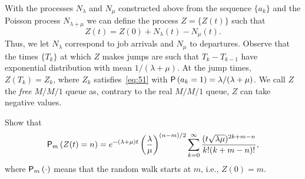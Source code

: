 With the processes $N_\lambda$ and $N_\mu$ constructed above from the sequence $\{a_k\}$ and the Poisson process $N_{\lambda+\mu}$ we can define the process $Z=\{Z(t)\}$ such that
\begin{equation*}
  Z(t) = Z(0)+N_\lambda(t) - N_\mu(t).
\end{equation*}
Thus, we let $N_\lambda$ correspond to job  arrivals and $N_\mu$ to departures. Observe that the times $\{T_k\}$ at which $Z$ makes jumps are such that $T_k-T_{k-1}$ have exponential distribution with mean $1/(\lambda+\mu)$. At the jump times, $Z(T_k) = Z_k$, where $Z_k$ satisfies~\eqref{eq:51} with $\P{a_k = 1} = \lambda/(\lambda+\mu)$.  We call $Z$ the \emph{free} $M/M/1$ queue as, contrary to the real $M/M/1$ queue, $Z$ can take negative values. 

\begin{exercise}  
Show that
\begin{equation*}
    \P{Z(t)=n}_m 
= e^{-(\lambda+\mu)t} \left(\frac\lambda\mu\right)^{(n-m)/2} \sum_{k=0}^\infty 
\frac{(t\sqrt{\lambda\mu} )^{2k+m-n}}{k!(k+m-n)!},
\end{equation*}
where $\P{\cdot}_m$ means that the random walk starts at $m$, i.e.,
$Z(0)=m$.


\end{exercise}
